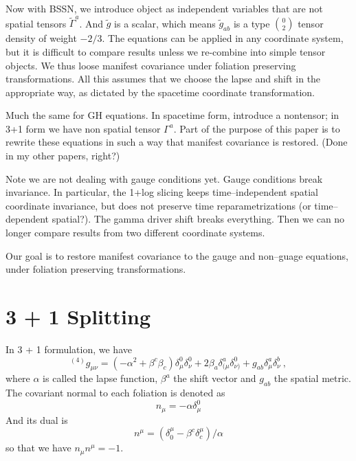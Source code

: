 \documentclass[letterpaper,nofootinbib,prd,amsmath,onecolumn]{revtex4-1}
\begin{document}
Now with BSSN, we introduce object as independent variables that are not spatial tensors $\tilde\Gamma^a$. 
And $\tilde g$ is a scalar, which means $\tilde g_{ab}$ is a type $0\choose 2$ tensor density of 
weight $-2/3$. The equations can be applied in any coordinate 
system, but it is difficult to  compare results unless we re-combine into simple tensor objects. 
We thus loose manifest covariance under foliation preserving transformations. All this assumes that we choose the 
lapse and shift in the appropriate way, as dictated by the spacetime coordinate transformation. 

Much the same for GH equations. In spacetime form, introduce 
a nontensor; in 3+1 form\cite{Brown:2011qg} we have non spatial tensor $\Gamma^a$. Part of the purpose of this paper is to rewrite 
these equations in such a way that manifest covariance is restored. (Done in my other papers, right?) 

Note we are not dealing with gauge conditions yet. Gauge conditions break invariance. In particular, the 
1+log slicing keeps time--independent spatial coordinate invariance, but does not preserve time 
reparametrizations (or time--dependent spatial?). The gamma driver shift breaks everything. Then we 
can no longer compare results from two different coordinate systems. 

Our goal is to restore manifest covariance to the gauge and non--guage equations, under 
foliation preserving transformations. 

\section{3 + 1 Splitting}\label{3+1}
In 3 + 1 formulation, we have
\begin{equation*}
	{}^{\left(4\right)}g_{\mu\nu} = \left(-\alpha^2 + \beta^{c}\beta_{c}\right)\delta_\mu^0\delta_\nu^0 
	+ 2\beta_{a}\delta_{(\mu}^a\delta_{\nu)}^0 + g_{ab} \delta^a_\mu \delta^b_\nu \ ,
\end{equation*}
where $\alpha$ is called the lapse function, $\beta^{a}$ the shift vector and $g_{ab}$ the spatial metric. The covariant normal to each foliation is denoted as
\begin{equation}\label{normal covector}
n_{\mu} = -\alpha\delta^{0}_{\mu}
\end{equation}
 And its dual is
\begin{equation}\label{normal vector}
n^{\mu} = \left(\delta^{\mu}_{0} - \beta^{c}\delta^{\mu}_{c}\right)/\alpha
\end{equation}
so that we have $n_{\mu}n^{\mu} = -1$. 
\end{document}
